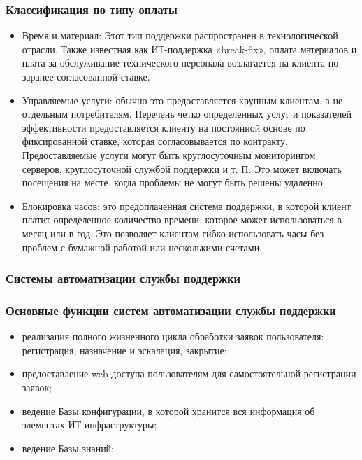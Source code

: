 \documentclass{industrial-development}
\begin{document}
\begin{frame} \frametitle{Классификация по типу оплаты}
	\begin{itemize} 
		\item Время и материал: Этот тип поддержки распространен в технологической отрасли. Также известная как ИТ-поддержка «break-fix», оплата материалов и плата за обслуживание технического персонала возлагается на клиента по заранее согласованной ставке.
        \item Управляемые услуги: обычно это предоставляется крупным клиентам, а не отдельным потребителям. Перечень четко определенных услуг и показателей эффективности предоставляется клиенту на постоянной основе по фиксированной ставке, которая согласовывается по контракту. Предоставляемые услуги могут быть круглосуточным мониторингом серверов, круглосуточной службой поддержки и т. П. Это может включать посещения на месте, когда проблемы не могут быть решены удаленно.
        \item Блокировка часов: это предоплаченная система поддержки, в которой клиент платит определенное количество времени, которое может использоваться в месяц или в год. Это позволяет клиентам гибко использовать часы без проблем с бумажной работой или несколькими счетами. 
	\end{itemize}
\end{frame}

\lecturenotes

\begin{frame} \frametitle{Системы автоматизации службы поддержки}

\end{frame}
\lecturenotes


\begin{frame} \frametitle{Основные функции систем автоматизации службы поддержки}
	\begin{itemize} 
		\item реализация полного жизненного цикла обработки заявок пользователя: регистрация, назначение и эскалация, закрытие;
		\item предоставление web-доступа пользователям для самостоятельной регистрации заявок;
		\item ведение Базы конфигурации, в которой хранится вся информация об элементах ИТ-инфраструктуры;
		\item ведение Базы знаний;
	\end{itemize}
\end{frame}
\lecturenotes
\end{document}
